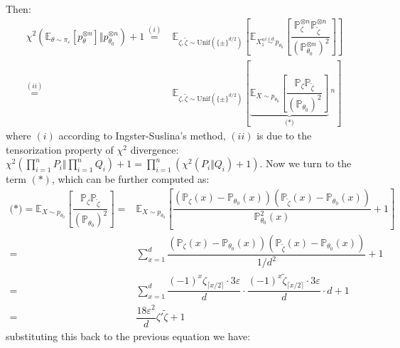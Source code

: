 \documentclass[twoside,12pt]{article}
\begin{document}
Then:
\begin{align*}
   \chi^2(\mathbb{E}_{\theta \sim \pi_\varepsilon }\left[ p_\theta ^{\otimes n} \right] \Vert p_{\theta _0}^{\otimes n} ) +1 \mathop{ = }\limits^{(i)}& \mathbb{E}_{\zeta ,\tilde{\zeta } \sim \mathrm{ Unif }(\{\pm\}^{d/2}) }\left[ \mathbb{E}_{X_1^n\mathop{ \sim }\limits^{i.i.d.} p_{\theta _0}}\left[ \dfrac{ \mathbb{P}_\zeta ^{\otimes n}\mathbb{P}_{\tilde{\zeta }}^{\otimes n} }{ (\mathbb{P}_{\theta _0}^{\otimes n})^2 }  \right]\right]  \\
   \mathop{ = }\limits^{(ii)} & \mathbb{E}_{\zeta ,\tilde{\zeta } \sim \mathrm{ Unif }(\{\pm\}^{d/2}) }\left[ \underbrace{\mathbb{E}_{X\sim p_{\theta _0}}\left[ \dfrac{ \mathbb{P}_\zeta \mathbb{P}_{\tilde{\zeta }}}{ (\mathbb{P}_{\theta _0})^2 }  \right]}_{\text{(*)}}\,^n\right] 
\end{align*}
where $ (i) $ according to Ingster-Suslina's method, $ (ii) $ is due to the tensorization property of $ \chi^2 $ divergence: $ \chi^2(\prod_{i=1}^n P_i\Vert \prod_{i=1}^n Q_i) + 1 = \prod_{i=1}^n(\chi^2(P_i\Vert Q_i)+1) $. Now we turn to the term $ (*) $, which can be further computed as:
\begin{align*}
   \text{(*)}=\mathbb{E}_{X\sim p_{\theta _0}}\left[ \dfrac{ \mathbb{P}_\zeta \mathbb{P}_{\tilde{\zeta }}}{ (\mathbb{P}_{\theta _0})^2 }  \right]=& \mathbb{E}_{X\sim p_{\theta _0}}\left[ \dfrac{ (\mathbb{P}_\zeta (x)-\mathbb{P}_{\theta _0}(x))(\mathbb{P}_{\tilde{\zeta }} (x)-\mathbb{P}_{\theta _0}(x)) }{ \mathbb{P}_{\theta _0}^2(x) } +1 \right]\\
   =& \sum_{x=1}^d \dfrac{ (\mathbb{P}_\zeta (x)-\mathbb{P}_{\theta _0}(x))(\mathbb{P}_{\tilde{\zeta }} (x)-\mathbb{P}_{\theta _0}(x)) }{1/d^2} +1\\
   =& \sum_{x=1}^d\dfrac{ (-1)^x\zeta _{\lceil x/2 \rceil}\cdot 3\varepsilon }{d}\cdot \dfrac{ (-1)^x\tilde{\zeta }_{\lceil x/2 \rceil}\cdot 3\varepsilon }{d} \cdot d +1\\
   =& \dfrac{ 18\varepsilon ^2 }{ d }\zeta '\tilde{\zeta } +1
\end{align*}
substituting this back to the previous equation we have:
\end{document}
